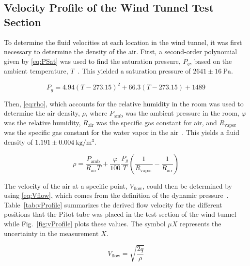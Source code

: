 \documentclass[journal,letterpaper]{IEEEtran}
\begin{document}
\subsection{Velocity Profile of the Wind Tunnel Test Section}

To determine the fluid velocities at each location in the wind tunnel, it was first necessary to determine the density of the air.
First, a second-order polynomial given by \eqref{eq:PSat} was used to find the saturation pressure, $P_g$, based on the ambient temperature, $T$~\cite{calculator}.
This yielded a saturation pressure of $2641 \pm \qty{16}{\pascal}$.

\begin{equation} \label{eq:PSat}
    P_g = 4.94(T - 273.15)^2 + 66.3(T - 273.15) + 1489
\end{equation}

Then, \eqref{eq:rho}, which accounts for the relative humidity in the room was used to determine the air density, $\rho$, where $P_\text{amb}$ was the ambient pressure in the room, $\varphi$ was the relative humidity, $R_\text{air}$ was the specific gas constant for air, and $R_\text{vapor}$ was the specific gas constant for the water vapor in the air~\cite{calculator}.
This yields a fluid density of $1.191 \pm \qty{0.004}{\kg\per\m\cubed}$.

\begin{equation} \label{eq:rho}
    \rho = \frac{P_\text{amb}}{R_\text{air} T} + \frac{\varphi}{100}\frac{P_g}{T}\left(\frac{1}{R_\text{vapor}} - \frac{1}{R_\text{air}}\right)
\end{equation}

The velocity of the air at a specific point, $V_\text{flow}$, could then be determined by using \eqref{eq:Vflow}, which comes from the definition of the dynamic pressure~\cite{lecture}.
Table~\ref{tab:vProfile} summarizes the derived flow velocity for the different positions that the Pitot tube was placed in the test section of the wind tunnel while Fig.~\ref{fig:vProfile} plots these values. The symbol $\mu X$ represents the uncertainty in the measurement $X$.

\begin{equation} \label{eq:Vflow}
    V_\text{flow} = \sqrt{\frac{2q}{\rho}}
\end{equation}
\end{document}
